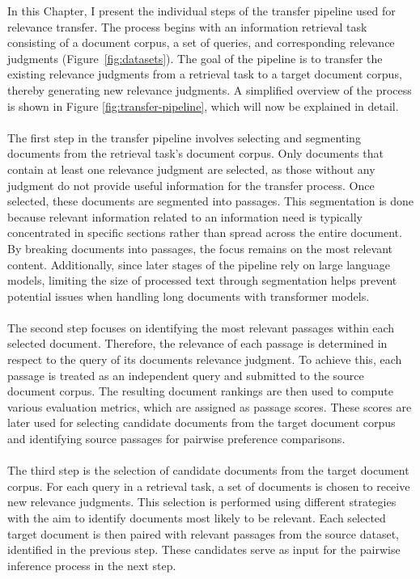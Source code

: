In this Chapter, I present the individual steps of the transfer pipeline used for relevance transfer. The process begins with an information retrieval task consisting of a document corpus, a set of queries, and corresponding relevance judgments (Figure~\ref{fig:datasets}). The goal of the pipeline is to transfer the existing relevance judgments from a retrieval task to a target document corpus, thereby generating new relevance judgments. A simplified overview of the process is shown in Figure \ref{fig:transfer-pipeline}, which will now be explained in detail.
\\\\
The first step in the transfer pipeline involves selecting and segmenting documents from the retrieval task's document corpus. Only documents that contain at least one relevance judgment are selected, as those without any judgment do not provide useful information for the transfer process. Once selected, these documents are segmented into passages. This segmentation is done because relevant information related to an information need is typically concentrated in specific sections rather than spread across the entire document. By breaking documents into passages, the focus remains on the most relevant content. Additionally, since later stages of the pipeline rely on large language models, limiting the size of processed text through segmentation helps prevent potential issues when handling long documents with transformer models.
\\\\
The second step focuses on identifying the most relevant passages within each selected document. Therefore, the relevance of each passage is determined in respect to the query of its documents relevance judgment. To achieve this, each passage is treated as an independent query and submitted to the source document corpus. The resulting document rankings are then used to compute various evaluation metrics, which are assigned as passage scores. These scores are later used for selecting candidate documents from the target document corpus and identifying source passages for pairwise preference comparisons.
\\\\
The third step is the selection of candidate documents from the target document corpus. For each query in a retrieval task, a set of documents is chosen to receive new relevance judgments. This selection is performed using different strategies with the aim to identify documents most likely to be relevant. Each selected target document is then paired with relevant passages from the source dataset, identified in the previous step. These candidates serve as input for the pairwise inference process in the next step.
